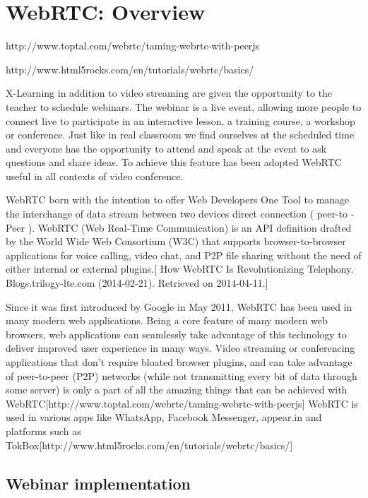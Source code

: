 \newpage
\section{WebRTC: Overview}
\label{sec:WebRTC: Overview}


http://www.toptal.com/webrtc/taming-webrtc-with-peerjs

http://www.html5rocks.com/en/tutorials/webrtc/basics/


X-Learning in addition to video streaming are given the opportunity to the teacher to schedule webinars.
The webinar is a live event, allowing more people to connect live to participate in an interactive lesson, a training course, a workshop or conference. Just like in real classroom we find ourselves at the scheduled time and everyone has the opportunity to attend and speak at the event to ask questions and share ideas.
To achieve this feature has been adopted WebRTC useful in all contexts of video conference.

WebRTC born with the intention to offer Web Developers One Tool to manage the interchange of data stream between two devices direct connection ( peer-to -Peer ).
WebRTC (Web Real-Time Communication) is an API definition drafted by the World Wide Web Consortium (W3C) that supports browser-to-browser applications for voice calling, video chat, and P2P file sharing without the need of either internal or external plugins.[ How WebRTC Is Revolutionizing Telephony. Blogs.trilogy-lte.com (2014-02-21). Retrieved on 2014-04-11.]

Since it was first introduced by Google in May 2011, WebRTC has been used in many modern web applications. Being a core feature of many modern web browsers, web applications can seamlessly take advantage of this technology to deliver improved user experience in many ways. Video streaming or conferencing applications that don’t require bloated browser plugins, and can take advantage of peer-to-peer (P2P) networks (while not transmitting every bit of data through some server) is only a part of all the amazing things that can be achieved with WebRTC[http://www.toptal.com/webrtc/taming-webrtc-with-peerjs]
WebRTC is used in various apps like WhatsApp, Facebook Messenger, appear.in and platforms such as TokBox[http://www.html5rocks.com/en/tutorials/webrtc/basics/]

\subsection{Webinar implementation}
\label{sec:Webinar implementation}

